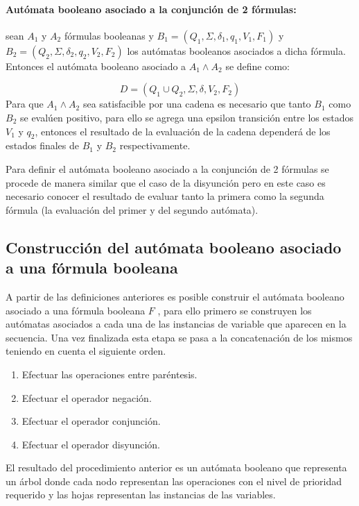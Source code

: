 \documentclass[12pt]{article}
\begin{document}

\paragraph{Autómata booleano asociado a la conjunción de 2 fórmulas:} sean $A_1$ y $A_2$ fórmulas booleanas y
$B_1=(Q_1,\Sigma,\delta_1,q_1,V_1,F_1)$ y $B_2=(Q_2,\Sigma,\delta_2,q_2,V_2,F_2)$ los autómatas booleanos asociados a dicha fórmula. Entonces el autómata booleano asociado a
$A_1 \wedge A_2$ se define como:

$$
      D=(Q_1\cup Q_2,\Sigma,\delta,V_2, F_2)
$$
Para que $A_1 \wedge A_2$ sea satisfacible por una cadena es necesario que tanto $B_1$ como $B_2$ se evalúen positivo, 
para ello se agrega una epsilon transición entre los estados $V_1$ y $q_2$, entonces el resultado de la evaluación de la 
cadena dependerá de los estados finales de $B_1$ y $B_2$ respectivamente.

Para definir el autómata booleano asociado a la conjunción de 2 fórmulas se procede de manera similar que el caso de la
disyunción pero en este caso es necesario conocer el resultado de evaluar tanto la primera como la segunda fórmula (la evaluación
del primer y del segundo autómata).

\subsection{Construcción del autómata booleano asociado a una fórmula booleana}

A partir de las definiciones anteriores es posible construir el autómata booleano asociado a una fórmula booleana $F$ \cite{aCFSAT},
para ello primero se construyen los autómatas asociados a cada una de las instancias de variable que
aparecen en la secuencia. Una vez finalizada esta etapa se pasa a la concatenación de los
mismos teniendo en cuenta el siguiente orden.

\begin{enumerate}
      \item Efectuar las operaciones entre paréntesis.
      \item Efectuar el operador negación.
      \item Efectuar el operador conjunción.
      \item Efectuar el operador disyunción.
\end{enumerate}

El resultado del procedimiento anterior es un autómata booleano que representa un árbol donde cada nodo representan las operaciones 
con el nivel de prioridad requerido y las hojas representan las instancias de las variables.
\end{document}

